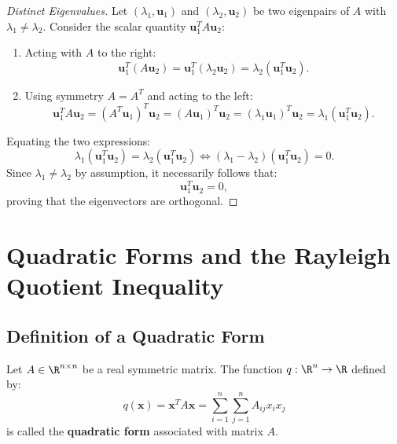 \begin{proof}[Distinct Eigenvalues]
Let $(\lambda_1, \mathbf{u}_1)$ and $(\lambda_2, \mathbf{u}_2)$ be two eigenpairs of $A$ with $\lambda_1 \neq \lambda_2$. Consider the scalar quantity $\mathbf{u}_1^T A \mathbf{u}_2$:
\begin{enumerate}
    \item Acting with $A$ to the right:
    \begin{equation}
        \mathbf{u}_1^T (A \mathbf{u}_2) = \mathbf{u}_1^T (\lambda_2 \mathbf{u}_2) = \lambda_2 (\mathbf{u}_1^T \mathbf{u}_2).
    \end{equation}
    \item Using symmetry $A = A^T$ and acting to the left:
    \begin{equation}
        \mathbf{u}_1^T A \mathbf{u}_2 = (A^T \mathbf{u}_1)^T \mathbf{u}_2 = (A \mathbf{u}_1)^T \mathbf{u}_2 = (\lambda_1 \mathbf{u}_1)^T \mathbf{u}_2 = \lambda_1 (\mathbf{u}_1^T \mathbf{u}_2).
    \end{equation}
\end{enumerate}
Equating the two expressions:
\begin{equation}
    \lambda_1 (\mathbf{u}_1^T \mathbf{u}_2) = \lambda_2 (\mathbf{u}_1^T \mathbf{u}_2) \iff (\lambda_1 - \lambda_2) (\mathbf{u}_1^T \mathbf{u}_2) = 0.
\end{equation}
Since $\lambda_1 \neq \lambda_2$ by assumption, it necessarily follows that:
\begin{equation}
    \mathbf{u}_1^T \mathbf{u}_2 = 0,
\end{equation}
proving that the eigenvectors are orthogonal.
\end{proof}

\FloatBarrier
\section{Quadratic Forms and the Rayleigh Quotient Inequality}
\label{sec:en:quadratic-forms-rayleigh}

\subsection{Definition of a Quadratic Form}

\begin{definition}
Let $A \in \R^{n \times n}$ be a real symmetric matrix. The function $q: \R^n \to \R$ defined by:
\begin{equation}
    q(\mathbf{x}) = \mathbf{x}^T A \mathbf{x} = \sum_{i=1}^n \sum_{j=1}^n A_{ij} x_i x_j
\end{equation}
is called the \textbf{quadratic form} associated with matrix $A$.
\end{definition}

